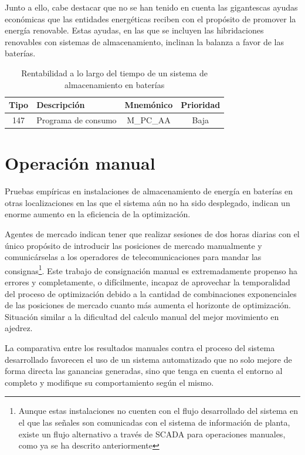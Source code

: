 Junto a ello, cabe destacar que no se han tenido en cuenta las gigantescas ayudas económicas que las entidades energéticas reciben con el propósito de promover la energía renovable. Estas ayudas, en las que se incluyen las hibridaciones renovables con sistemas de almacenamiento, inclinan la balanza a favor de las baterías.

\begin{table}[ht]
\centering
\begin{tabular}{|c|p{7.5cm}|c|c|}
\hline
Tipo & Descripción         & Mnemónico & Prioridad \\
\hline
147  & Programa de consumo & M\_PC\_AA & Baja      \\
\hline
\end{tabular}
\caption{Rentabilidad a lo largo del tiempo de un sistema de almacenamiento en baterías}
\label{tab:rentabilidad-bess}
\end{table}

\section{Operación manual}
\label{makereference7.2}

Pruebas empíricas en instalaciones de almacenamiento de energía en baterías en otras localizaciones en las que el sistema aún no ha sido desplegado, indican un enorme aumento en la eficiencia de la optimización.

Agentes de mercado indican tener que realizar sesiones de dos horas diarias con el único propósito de introducir las posiciones de mercado manualmente y comunicárselas a los operadores de telecomunicaciones para mandar las consignas\footnote{Aunque estas instalaciones no cuenten con el flujo desarrollado del sistema en el que las señales son comunicadas con el sistema de información de planta, existe un flujo alternativo a través de SCADA para operaciones manuales, como ya se ha descrito anteriormente}. Este trabajo de consignación manual es extremadamente propenso ha errores y completamente, o difícilmente, incapaz de aprovechar la temporalidad del proceso de optimización debido a la cantidad de combinaciones exponenciales de las posiciones de mercado cuanto más aumenta el horizonte de optimización. Situación similar a la dificultad del calculo manual del mejor movimiento en ajedrez.

La comparativa entre los resultados manuales contra el proceso del sistema desarrollado favorecen el uso de un sistema automatizado que no solo mejore de forma directa las ganancias generadas, sino que tenga en cuenta el entorno al completo y modifique su comportamiento según el mismo.

